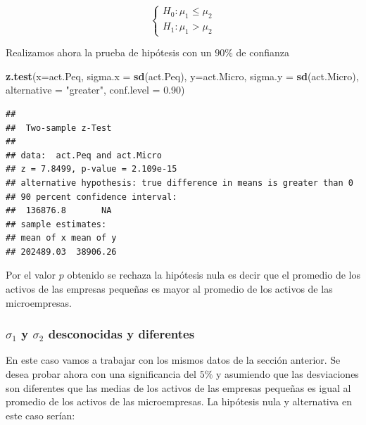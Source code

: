 \documentclass[letterpaper,]{book}
\newenvironment{Shaded}{\begin{snugshade}}{\end{snugshade}}
\newcommand{\DataTypeTok}[1]{\textcolor[rgb]{0.13,0.29,0.53}{#1}}
\newcommand{\FloatTok}[1]{\textcolor[rgb]{0.00,0.00,0.81}{#1}}
\newcommand{\KeywordTok}[1]{\textcolor[rgb]{0.13,0.29,0.53}{\textbf{#1}}}
\newcommand{\NormalTok}[1]{#1}
\newcommand{\StringTok}[1]{\textcolor[rgb]{0.31,0.60,0.02}{#1}}
\begin{document}
\begin{equation} 
\begin{cases} 
H_0: \mu_1 \leq \mu_2 \\ 
H_1: \mu_1 > \mu_2
\end{cases} 
\end{equation}

Realizamos ahora la prueba de hipótesis con un \(90\%\) de confianza

\begin{Shaded}
\begin{Highlighting}[]
\KeywordTok{z.test}\NormalTok{(}\DataTypeTok{x=}\NormalTok{act.Peq, }\DataTypeTok{sigma.x =} \KeywordTok{sd}\NormalTok{(act.Peq), }
       \DataTypeTok{y=}\NormalTok{act.Micro, }\DataTypeTok{sigma.y =} \KeywordTok{sd}\NormalTok{(act.Micro),}
       \DataTypeTok{alternative =} \StringTok{"greater"}\NormalTok{, }\DataTypeTok{conf.level =} \FloatTok{0.90}\NormalTok{)}
\end{Highlighting}
\end{Shaded}

\begin{verbatim}
## 
##  Two-sample z-Test
## 
## data:  act.Peq and act.Micro
## z = 7.8499, p-value = 2.109e-15
## alternative hypothesis: true difference in means is greater than 0
## 90 percent confidence interval:
##  136876.8       NA
## sample estimates:
## mean of x mean of y 
## 202489.03  38906.26
\end{verbatim}

Por el valor \(p\) obtenido se rechaza la hipótesis nula es decir que el promedio de los activos de las empresas pequeñas es mayor al promedio de los activos de las microempresas.

\hypertarget{sigma_1-y-sigma_2-desconocidas-y-diferentes}{%
\subsubsection{\texorpdfstring{\(\sigma_1\) y \(\sigma_2\) desconocidas y diferentes}{\textbackslash{}sigma\_1 y \textbackslash{}sigma\_2 desconocidas y diferentes}}\label{sigma_1-y-sigma_2-desconocidas-y-diferentes}}

En este caso vamos a trabajar con los mismos datos de la sección anterior. Se desea probar ahora con una significancia del \(5\%\) y asumiendo que las desviaciones son diferentes que las medias de los activos de las empresas pequeñas es igual al promedio de los activos de las microempresas. La hipótesis nula y alternativa en este caso serían:
\end{document}
